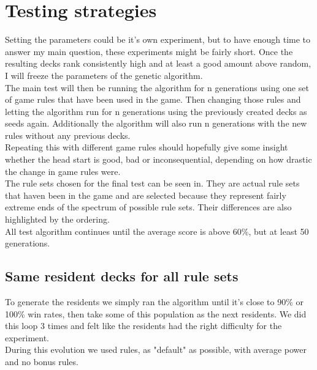 \section{Testing strategies}
\label{sec:method:testing}
Setting the parameters could be it’s own experiment, but to have enough time to answer my main question, these experiments might be fairly short. Once the resulting decks rank consistently high and at least a good amount above random, I will freeze the parameters of the genetic algorithm. \\
The main test will then be running the algorithm for n generations using one set of game rules that have been used in the game. Then changing those rules and letting the algorithm run for n generations using the previously created decks as seeds again. Additionally the algorithm will also run n generations with the new rules without any previous decks.  \\
Repeating this with different game rules should hopefully give some insight whether the head start is good, bad or inconsequential, depending on how drastic the change in game rules were. \\

The rule sets chosen for the final test can be seen in. They are actual rule sets that haven been in the game and are selected because they represent fairly extreme ends of the spectrum of possible rule sets. Their differences are also highlighted by the ordering. \\

\label{sec:method:testing:end}
All test algorithm continues until the average score is above 60\%, but at least 50 generations.\\

\label{sec:method:testing:rules1}
\label{sec:method:testing:rules2}
\label{sec:method:testing:rules3}

\subsection{Same resident decks for all rule sets}
\label{sec:method:testing:single}
To generate the residents we simply ran the algorithm until it's close to 90\% or 100\% win rates, then take some of this population as the next residents. We did this loop 3 times and felt like the residents had the right difficulty for the experiment.\\
During this evolution we used rules, as "default" as possible, with average power and no bonus rules.


